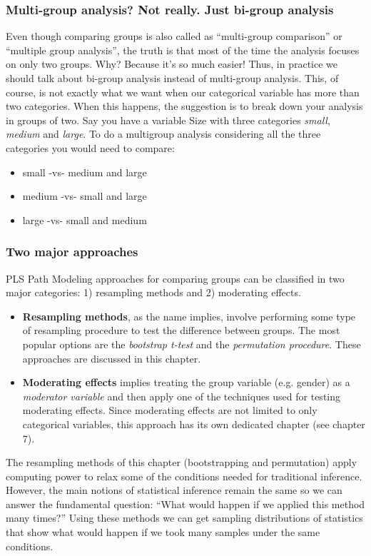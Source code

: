 \documentclass[12pt]{book}\usepackage{graphicx, color}
\begin{document}
\subsubsection*{Multi-group analysis? Not really. Just bi-group analysis}
Even though comparing groups is also called as ``multi-group comparison'' or ``multiple group analysis'', the truth is that most of the time the analysis focuses on only two groups. Why? Because it's so much easier! Thus, in practice we should talk about bi-group analysis instead of multi-group analysis. This, of course, is not exactly what we want when our categorical variable has more than two categories. When this happens, the suggestion is to break down your analysis in groups of two. Say you have a variable Size with three categories \textit{small}, \textit{medium} and \textit{large}. To do a multigroup analysis considering all the three categories you would need to compare:
\begin{itemize}
 \item[] small -vs- medium and large
 \item[] medium -vs- small and large
 \item[] large -vs- small and medium
\end{itemize}


\subsubsection*{Two major approaches}
PLS Path Modeling approaches for comparing groups can be classified in two major categories: 1) resampling methods and 2) moderating effects.
\begin{itemize}
 \item \textbf{Resampling methods}, as the name implies, involve performing some type of resampling procedure to test the difference between groups. The most popular options are the \textit{bootstrap t-test} and the \textit{permutation procedure}. These approaches are discussed in this chapter.
 \item \textbf{Moderating effects} implies treating the group variable (e.g. gender) as a \textit{moderator variable} and then apply one of the techniques used for testing moderating effects. Since moderating effects are not limited to only categorical variables, this approach has its own dedicated chapter (see chapter 7).
\end{itemize}

The resampling methods of this chapter (bootstrapping and permutation) apply computing power to relax some of the conditions needed for traditional inference. However, the main notions of statistical inference remain the same so we can answer the fundamental question: ``What would happen if we applied this method many times?'' Using these methods we can get sampling distributions of statistics that show what would happen if we took many samples under the same conditions.
\end{document}
